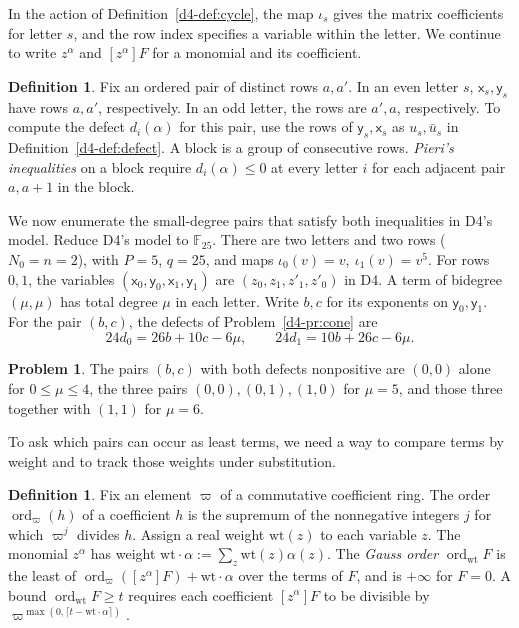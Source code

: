 \documentclass[reqno]{amsart}
\theoremstyle{plain}
\theoremstyle{definition}
\newtheorem{definition}[theorem]{Definition}
\newtheorem{problem}{Problem}[section]
\theoremstyle{remark}
\newcommand{\F}{\mathbb{F}}
\newcommand{\xv}{\mathsf{x}}
\newcommand{\yv}{\mathsf{y}}
\newcommand{\wt}{\mathrm{wt}}
\begin{document}
In the action of Definition~\ref{d4-def:cycle}, the map \(\iota_s\) gives the matrix coefficients for letter \(s\), and the row index specifies a variable within the letter.  We continue to write \(z^\alpha\) and \([z^\alpha]F\) for a monomial and its coefficient.

\begin{definition}\label{def:root-variables}
Fix an ordered pair of distinct rows \(a,a'\).  In an even letter \(s\), \(\xv_s,\yv_s\) have rows \(a,a'\), respectively.  In an odd letter, the rows are \(a',a\), respectively.  To compute the defect \(d_i(\alpha)\) for this pair, use the rows of \(\yv_s,\xv_s\) as \(u_s,\bar u_s\) in Definition~\ref{d4-def:defect}.  A block is a group of consecutive rows.  \emph{Pieri's inequalities} on a block require \(d_i(\alpha)\le0\) at every letter \(i\) for each adjacent pair \(a,a+1\) in the block.
\end{definition}

We now enumerate the small-degree pairs that satisfy both inequalities in D4's model.  Reduce D4's model to \(\F_{25}\).  There are two letters and two rows (\(N_0=n=2\)), with \(P=5\), \(q=25\), and maps \(\iota_0(v)=v,\ \iota_1(v)=v^5\).  For rows \(0,1\), the variables \((\xv_0,\yv_0,\xv_1,\yv_1)\) are \((z_0,z_1,z'_1,z'_0)\) in D4.  A term of bidegree \((\mu,\mu)\) has total degree \(\mu\) in each letter.  Write \(b,c\) for its exponents on \(\yv_0,\yv_1\).  For the pair \((b,c)\), the defects of Problem~\ref{d4-pr:cone} are
\[
  24 d_0=26b+10c-6\mu,\qquad 24 d_1=10b+26c-6\mu.
\]

\begin{problem}\label{pr:cone}
The pairs \((b,c)\) with both defects nonpositive are \((0,0)\) alone for \(0\le\mu\le4\), the three pairs \((0,0),(0,1),(1,0)\) for \(\mu=5\), and those three together with \((1,1)\) for \(\mu=6\).
\end{problem}

To ask which pairs can occur as least terms, we need a way to compare terms by weight and to track those weights under substitution.

\begin{definition}\label{def:gauss-order}
Fix an element \(\varpi\) of a commutative coefficient ring.  The order \(\operatorname{ord}_{\varpi}(h)\) of a coefficient \(h\) is the supremum of the nonnegative integers \(j\) for which \(\varpi^j\) divides \(h\).  Assign a real weight \(\wt(z)\) to each variable \(z\).  The monomial \(z^\alpha\) has weight \(\wt\cdot\alpha:=\sum_z\wt(z)\alpha(z)\).  The \emph{Gauss order} \(\operatorname{ord}_{\wt} F\) is the least of \(\operatorname{ord}_{\varpi}([z^\alpha]F)+\wt\cdot\alpha\) over the terms of \(F\), and is \(+\infty\) for \(F=0\).  A bound \(\operatorname{ord}_{\wt} F\ge t\) requires each coefficient \([z^\alpha]F\) to be divisible by \(\varpi^{\max(0,\lceil t-\wt\cdot\alpha\rceil)}\).
\end{definition}
\end{document}
